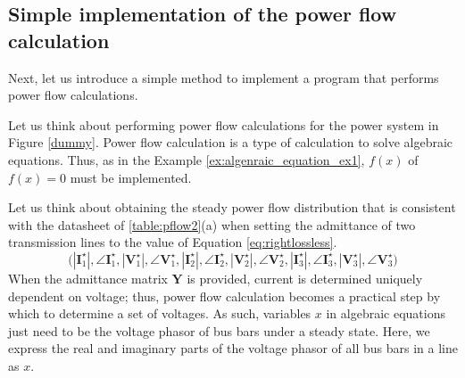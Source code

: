 \documentclass[graybox, envcountchap]{svmult}
\begin{document}
\subsection{Simple implementation of the power flow calculation}

Next, let us introduce a simple method to implement a program that performs power flow calculations.

\begin{example}\label{ex:simplepowerflow}
Let us think about performing power flow calculations for the power system in Figure \ref{dummy}.
Power flow calculation is a type of calculation to solve algebraic equations. Thus, as in the Example \nobreak\ref{ex:algenraic_equation_ex1}, $f(x)$ of $f(x)=0$ must be implemented.

Let us think about obtaining the steady power flow distribution that is consistent with the datasheet of \ref{table:pflow2}(a) when setting the admittance of two transmission lines to the value of Equation \ref{eq:rightlossless}. 
\[
\bigl(
|\bm{I}_1^{\star}|,\angle \bm{I}_1^{\star},
|\bm{V}_1^{\star}|,\angle \bm{V}_1^{\star},
|\bm{I}_2^{\star}|,\angle \bm{I}_2^{\star},
|\bm{V}_2^{\star}|,\angle \bm{V}_2^{\star},
|\bm{I}_3^{\star}|,\angle \bm{I}_3^{\star},
|\bm{V}_3^{\star}|,\angle \bm{V}_3^{\star}
\bigr)
\]
When the admittance matrix $\bm Y$ is provided, current is determined uniquely dependent on voltage; thus, power flow calculation becomes a practical step by which to determine a set of voltages.
As such, variables $x$ in algebraic equations just need to be the voltage phasor of bus bars under a steady state.
Here, we express the real and imaginary parts of the voltage phasor of all bus bars in a line as $x$.


\end{example}
\end{document}
